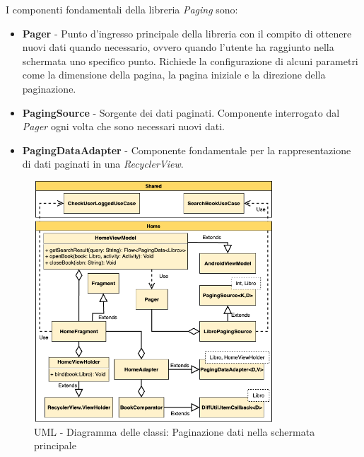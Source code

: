 I componenti fondamentali della libreria \textit{Paging} sono:

\begin{itemize}
    \item \textbf{Pager} - Punto d'ingresso principale della libreria con il compito di ottenere nuovi dati quando necessario, ovvero quando l'utente ha raggiunto nella schermata uno specifico punto. Richiede la configurazione di alcuni parametri come la dimensione della pagina, la pagina iniziale e la direzione della paginazione. 
    
    \item \textbf{PagingSource} - Sorgente dei dati paginati. Componente interrogato dal \textit{Pager} ogni volta che sono necessari nuovi dati.
    
    \item \textbf{PagingDataAdapter} - Componente fondamentale per la rappresentazione di dati paginati in una \textit{RecyclerView}.
\end{itemize}

\begin{figure}[H]
    \centering
    \includegraphics[width=0.8\textwidth]{img/android-viewmodel.png}
    \caption{UML - Diagramma delle classi: Paginazione dati nella schermata principale}
    \label{android-viewmodel-png}
\end{figure}

